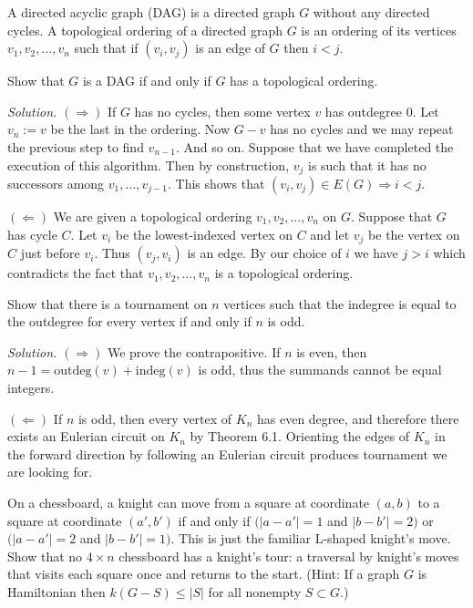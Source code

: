 \documentclass[10pt,reqno]{amsart}
\begin{document}
\begin{outline}[enumerate]
\medskip
\1 A directed acyclic graph (DAG) is a directed graph $G$ without any directed
cycles. A topological ordering of a directed graph $G$ is an ordering of its
vertices $v_1,v_2,\dots,v_n$ such that if $(v_i,v_j)$ is an edge of $G$ then $i
< j$.

Show that $G$ is a DAG if and only if $G$ has a topological ordering.

\medskip
\noindent \emph{Solution.} $(\Rightarrow)$ If $G$ has no cycles, then some
vertex $v$ has outdegree 0. Let $v_n := v$ be the last in the ordering. Now
$G-v$ has no cycles and we may repeat the previous step to find $v_{n-1}$. And
so on. Suppose that we have completed the execution of this algorithm. Then by
construction, $v_j$ is such that it has no successors among $v_1, \dots,
v_{j-1}$. This shows that $(v_i,v_j) \in E(G) \Rightarrow i < j$.

$(\Leftarrow)$ We are given a topological ordering $v_1,v_2,\dots,v_n$ on $G$.
Suppose that $G$ has cycle $C$. Let $v_i$ be the lowest-indexed vertex on $C$
and let $v_j$ be the vertex on $C$ just before $v_i$. Thus $(v_j,v_i)$ is an
edge. By our choice of $i$ we have $j > i$ which contradicts the fact that
$v_1,v_2,\dots,v_n$ is a topological ordering.

\medskip
\1 Show that there is a tournament on $n$ vertices such that the indegree is
equal to the outdegree for every vertex if and only if $n$ is odd.

\medskip
\noindent \emph{Solution.} $(\Rightarrow)$ We prove the contrapositive. If $n$
is even, then $n-1 = \mathrm{outdeg}(v) + \mathrm{indeg}(v)$ is odd, thus the
summands cannot be equal integers.

$(\Leftarrow)$ If $n$ is odd, then every vertex of $K_n$ has even degree, and
therefore there exists an Eulerian circuit on $K_n$ by Theorem 6.1. Orienting
the edges of $K_n$ in the forward direction by following an Eulerian circuit
produces tournament we are looking for.

\medskip
\1 On a chessboard, a knight can move from a square at coordinate $(a,b)$ to a
square at coordinate $(a',b')$ if and only if $(|a-a'| = 1$ and $|b-b'| = 2)$
or $(|a-a'| = 2$ and $|b-b'| =1)$. This is just the familiar L-shaped knight's
move. Show that no $4\times n$ chessboard has a knight's tour: a traversal by
knight's moves that visits each square once and returns to the start. (Hint: If
a graph $G$ is Hamiltonian then $k(G-S) \le |S|$ for all nonempty $S \subset
G$.)


\end{outline}
\end{document}
